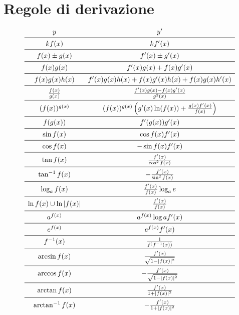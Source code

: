 \section{Regole di derivazione}
\begin{equation}
\begin{array}{ c c }
y & y^\prime \\ \midrule
kf(x) & kf^\prime(x) \\ \midrule
f(x)\pm g(x) & f^\prime(x)\pm g^\prime(x) \\ \midrule
f(x)g(x) & f^\prime(x)g(x)+f(x)g^\prime(x) \\ \midrule
f(x)g(x)h(x) & f^\prime(x)g(x)h(x)+f(x)g^\prime(x)h(x)+f(x)g(x)h^\prime(x) \\ \midrule
\frac{f(x)}{g(x)} & \frac{f^\prime(x)g(x)-f(x)g^\prime(x)}{g^2(x)} \\ \midrule
(f(x))^{g(x)} & (f(x))^{g(x)} \left(g^\prime(x)\ln(f(x))+\frac{g(x)f^\prime(x)}{f(x)}\right) \\ \midrule
f(g(x)) & f^\prime(g(x))g^\prime(x) \\ \midrule
\sin f(x) & \cos f(x)f^\prime(x) \\ \midrule
\cos f(x) & -\sin f(x)f^\prime(x) \\ \midrule
\tan f(x) & \frac{f^\prime(x)}{\cos^2f(x)} \\ \midrule
\tan^{-1}f(x) & -\frac{f^\prime(x)}{\sin^2f(x)} \\ \midrule
\log_a f(x) & \frac{f^\prime(x)}{f(x)}\log_a e \\ \midrule
\ln f(x)\cup\ln|f(x)| & \frac{f^\prime(x)}{f(x)} \\ \midrule
a^{f(x)} & a^{f(x)} \log a f^\prime(x) \\ \midrule
e^{f(x)} & e^{f(x)} f^\prime(x) \\ \midrule
f^{-1}(x) & \frac{1}{f^(f^{-1}(x))} \\ \midrule
\arcsin f(x) & \frac{f^\prime(x)}{\sqrt{1-|f(x)|^2}} \\ \midrule
\arccos f(x) & -\frac{f^\prime(x)}{\sqrt{1-|f(x)|^2}} \\ \midrule
\arctan f(x) & \frac{f^\prime(x)}{1+|f(x)|^2} \\ \midrule
\arctan^{-1} f(x) & -\frac{f^\prime(x)}{1+|f(x)|^2} \\
\end{array}
\end{equation}